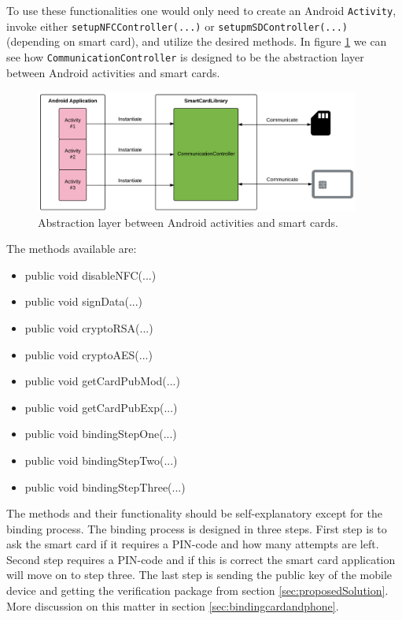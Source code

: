To use these functionalities one would only need to create an Android \texttt{Activity}, invoke either \texttt{\allowbreak setupNFCController(...)} or \texttt{setupmSDController(...)} (depending on smart card), and utilize the desired methods. In figure \ref{fig:instantiateflow} we can see how \texttt{CommunicationController} is designed to be the abstraction layer between Android activities and smart cards.


\begin{figure}[h!]
  \caption{Abstraction layer between Android activities and smart cards.}
  \label{fig:instantiateflow}
  \centering
    \includegraphics[width=0.95\textwidth]{images/Instantiate_flow.png}
\end{figure}

The methods available are:

\begin{itemize}
    \item public void disableNFC(...)
    \item public void signData(...)
    \item public void cryptoRSA(...)
    \item public void cryptoAES(...)
    \item public void getCardPubMod(...)
    \item public void getCardPubExp(...)
    \item public void bindingStepOne(...)
    \item public void bindingStepTwo(...)
    \item public void bindingStepThree(...)
\end{itemize}

The methods and their functionality should be self-explanatory except for the binding process. The binding process is designed in three steps. First step is to ask the smart card if it requires a PIN-code and how many attempts are left. Second step requires a PIN-code and if this is correct the smart card application will move on to step three. The last step is sending the public key of the mobile device and getting the verification package from section \ref{sec:proposedSolution}. More discussion on this matter in section \ref{sec:bindingcardandphone}.

